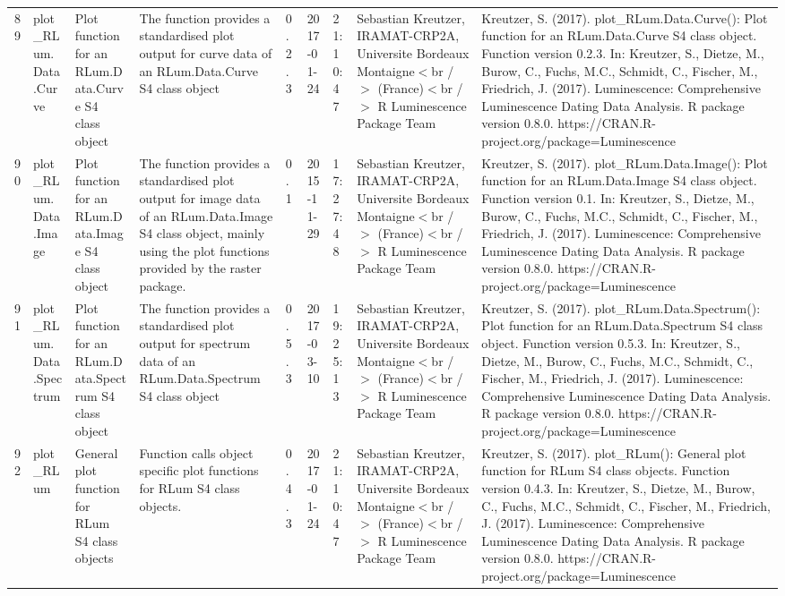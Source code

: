 \begin{table}[ht]
\begin{tabular}{rllllllll}
 \\ 
  89 & plot\_RLum.Data.Curve & Plot function for an RLum.Data.Curve S4 class object & The function provides a standardised plot output for curve data of an RLum.Data.Curve S4 class object & 0.2.3 & 2017-01-24 & 21:10:47
 & Sebastian Kreutzer, IRAMAT-CRP2A, Universite Bordeaux Montaigne$<$br /$>$ (France)$<$br /$>$  R Luminescence Package Team & Kreutzer, S. (2017). plot\_RLum.Data.Curve(): Plot function for an RLum.Data.Curve S4 class object. Function version 0.2.3. In: Kreutzer, S., Dietze, M., Burow, C., Fuchs, M.C., Schmidt, C., Fischer, M., Friedrich, J. (2017). Luminescence: Comprehensive Luminescence Dating Data Analysis. R package version 0.8.0. https://CRAN.R-project.org/package=Luminescence
 \\ 
  90 & plot\_RLum.Data.Image & Plot function for an  RLum.Data.Image  S4 class object & The function provides a standardised plot output for image data of an RLum.Data.Image S4 class object, mainly using the plot functions provided by the  raster  package. & 0.1 & 2015-11-29 & 17:27:48
 & Sebastian Kreutzer, IRAMAT-CRP2A, Universite Bordeaux Montaigne$<$br /$>$ (France)$<$br /$>$  R Luminescence Package Team & Kreutzer, S. (2017). plot\_RLum.Data.Image(): Plot function for an RLum.Data.Image S4 class object. Function version 0.1. In: Kreutzer, S., Dietze, M., Burow, C., Fuchs, M.C., Schmidt, C., Fischer, M., Friedrich, J. (2017). Luminescence: Comprehensive Luminescence Dating Data Analysis. R package version 0.8.0. https://CRAN.R-project.org/package=Luminescence
 \\ 
  91 & plot\_RLum.Data.Spectrum & Plot function for an RLum.Data.Spectrum S4 class object & The function provides a standardised plot output for spectrum data of an RLum.Data.Spectrum S4 class object & 0.5.3 & 2017-03-10 & 19:25:13
 & Sebastian Kreutzer, IRAMAT-CRP2A, Universite Bordeaux Montaigne$<$br /$>$ (France)$<$br /$>$  R Luminescence Package Team & Kreutzer, S. (2017). plot\_RLum.Data.Spectrum(): Plot function for an RLum.Data.Spectrum S4 class object. Function version 0.5.3. In: Kreutzer, S., Dietze, M., Burow, C., Fuchs, M.C., Schmidt, C., Fischer, M., Friedrich, J. (2017). Luminescence: Comprehensive Luminescence Dating Data Analysis. R package version 0.8.0. https://CRAN.R-project.org/package=Luminescence
 \\ 
  92 & plot\_RLum & General plot function for RLum S4 class objects & Function calls object specific plot functions for RLum S4 class objects. & 0.4.3 & 2017-01-24 & 21:10:47
 & Sebastian Kreutzer, IRAMAT-CRP2A, Universite Bordeaux Montaigne$<$br /$>$ (France)$<$br /$>$  R Luminescence Package Team & Kreutzer, S. (2017). plot\_RLum(): General plot function for RLum S4 class objects. Function version 0.4.3. In: Kreutzer, S., Dietze, M., Burow, C., Fuchs, M.C., Schmidt, C., Fischer, M., Friedrich, J. (2017). Luminescence: Comprehensive Luminescence Dating Data Analysis. R package version 0.8.0. https://CRAN.R-project.org/package=Luminescence

\end{tabular}
\end{table}

